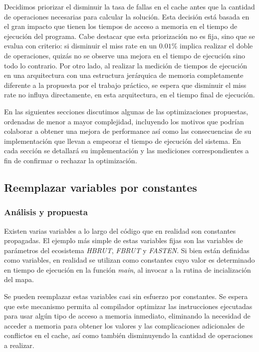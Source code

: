 \documentclass[a4paper,11pt]{article}
\begin{document}
Decidimos priorizar el disminuir la tasa de fallas en el cache antes que la
cantidad de operaciones necesarias para calcular la solución. Esta decisión
está basada en el gran impacto que tienen los tiempos de acceso a memoria en el
tiempo de ejecución del programa. Cabe destacar que esta priorización no es
fija, sino que se evalua con criterio: si disminuir el miss rate en un
\(0.01\%\) implica realizar el doble de operaciones, quizás no se observe una
mejora en el tiempo de ejecución sino todo lo contrario. Por otro lado, al
realizar la medición de tiempos de ejecución en una arquitectura con una
estructura jerárquica de memoria completamente diferente a la propuesta por el
trabajo práctico, se espera que disminuir el miss rate no influya directamente,
en esta arquitectura, en el tiempo final de ejecución.

En las siguientes secciones discutimos algunas de las optimizaciones
propuestas, ordenadas de menor a mayor complejidad, incluyendo los motivos que
podrían colaborar a obtener una mejora de performance así como las
consecuencias de su implementación que llevan a empeorar el tiempo de ejecución
del sistema. En cada sección se detallará su implementación y las mediciones
correspondientes a fin de confirmar o rechazar la optimización.

\subsection{Reemplazar variables por constantes}

\subsubsection{Análisis y propuesta}

Existen varias variables a lo largo del código que en realidad son constantes
propagadas. El ejemplo más simple de estas variables fijas son las variables de
parámetros del ecosistema \textit{HBRUT}, \textit{FBRUT} y \textit{FASTEN}. Si
bien están definidas como variables, en realidad se utilizan como constantes
cuyo valor es determinado en tiempo de ejecución en la función \textit{main},
al invocar a la rutina de incialización del mapa.

Se pueden reemplazar estas variables casi sin esfuerzo por constantes. Se
espera que este mecanismo permita al compilador optimizar las instrucciones
ejecutadas para usar algún tipo de acceso a memoria inmediato, eliminando la
necesidad de acceder a memoria para obtener los valores y las complicaciones
adicionales de conflictos en el cache, así como también disminuyendo la
cantidad de operaciones a realizar.
\end{document}
